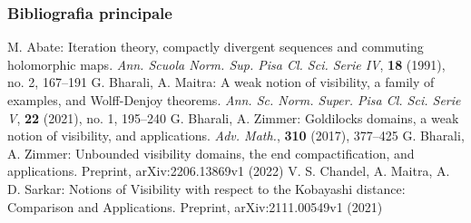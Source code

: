 \begin{frame}
  \frametitle{Bibliografia principale}
  \begin{thebibliography}{widest entry}
     M. Abate: Iteration theory, compactly divergent sequences and commuting holomorphic maps. \textit{ Ann. Scuola Norm. Sup. Pisa Cl. Sci. Serie IV}, \textbf{18} (1991), no. 2, 167--191
     G. Bharali, A. Maitra: A weak notion of visibility, a family of examples, and Wolff-Denjoy theorems. \textit{ Ann. Sc. Norm. Super. Pisa Cl. Sci. Serie V}, \textbf{22} (2021), no. 1, 195--240
     G. Bharali, A. Zimmer: Goldilocks domains, a weak notion of visibility, and applications. \textit{ Adv. Math.}, \textbf{310} (2017), 377--425
     G. Bharali, A. Zimmer: Unbounded visibility domains, the end compactification, and applications. Preprint, arXiv:2206.13869v1 (2022)
     V. S. Chandel, A. Maitra, A. D. Sarkar: Notions of Visibility with respect to the Kobayashi distance: Comparison and Applications. Preprint, arXiv:2111.00549v1 (2021)
  \end{thebibliography}
\end{frame}